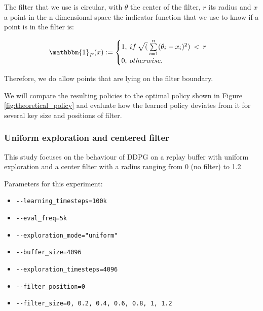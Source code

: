 \documentclass{article}
\begin{document}
The filter that we use is circular, with $\theta$ the center of the filter, $r$ its radius and $x$ a point in the n dimensional space the indicator function that we use to know if a point is in the filter is:

\begin{equation}
\mathbbm{1}_F(x) := 
    \begin{cases}
      1,\:if\:\sqrt(\sum\limits_{i=1}^n (\theta_i - x_i) ^ 2)\:<\:r\\
      0,\:otherwise.
      \end{cases}
\end{equation}
 
 Therefore, we do allow points that are lying on the filter boundary.
 
We will compare the resulting policies to the optimal policy shown in Figure \ref{fig:theoretical_policy} and evaluate how the learned policy deviates from it for several key size and positions of filter.

\subsubsection{Uniform exploration and centered filter}

This study focuses on the behaviour of DDPG on a replay buffer with uniform exploration and a  center filter with a radius ranging from 0 (no filter) to 1.2

Parameters for this experiment:
\begin{itemize}
    \item[] \lstinline|--learning_timesteps=100k|
    \item[] \lstinline|--eval_freq=5k|
    \item[] \lstinline|--exploration_mode="uniform"|
    \item[] \lstinline|--buffer_size=4096|
    \item[] \lstinline|--exploration_timesteps=4096|
    \item[] \lstinline|--filter_position=0|
    \item[] \lstinline|--filter_size=0, 0.2, 0.4, 0.6, 0.8, 1, 1.2|
\end{itemize}
\end{document}
